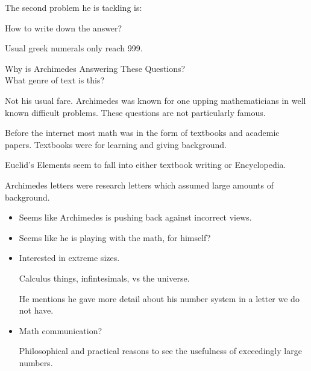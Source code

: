 \documentclass{report}
\begin{document}
\begin{description}
\begin{mdframed}
            \vspace{10pt}

            The second problem he is tackling is:
            \begin{mdframed}
                How to write down the answer?
            \end{mdframed}

            Usual greek numerals only reach 999.
        \end{mdframed}
    \item Why is Archimedes Answering These Questions?\\
        What genre of text is this?
        \begin{mdframed}
            Not his usual fare. Archimedes was known for one
            upping mathematicians in well known difficult problems.
            These questions are not particularly famous.

            \begin{mdframed}
                Before the internet most math was in the form
                of textbooks and academic papers. Textbooks
                were for learning and giving background.

                Euclid's Elements seem to fall into either
                textbook writing or Encyclopedia.

                Archimedes letters were research letters which
                assumed large amounts of background.
            \end{mdframed}

            \begin{itemize}
                \item Seems like Archimedes is pushing back against
                    incorrect views.
                \item Seems like he is playing with the
                    math, for himself?
                \item Interested in extreme sizes.
                    \begin{mdframed}
                        Calculus things, infintesimals, vs
                        the universe.
                    \end{mdframed}
                    \begin{mdframed}
                        He mentions he gave more detail about
                        his number system in a letter we do
                        not have.
                    \end{mdframed}
                \item Math communication?
                    \begin{mdframed}
                        Philosophical and practical reasons
                        to see the usefulness of exceedingly
                        large numbers.


\end{mdframed}
\end{itemize}
\end{mdframed}
\end{description}
\end{document}
